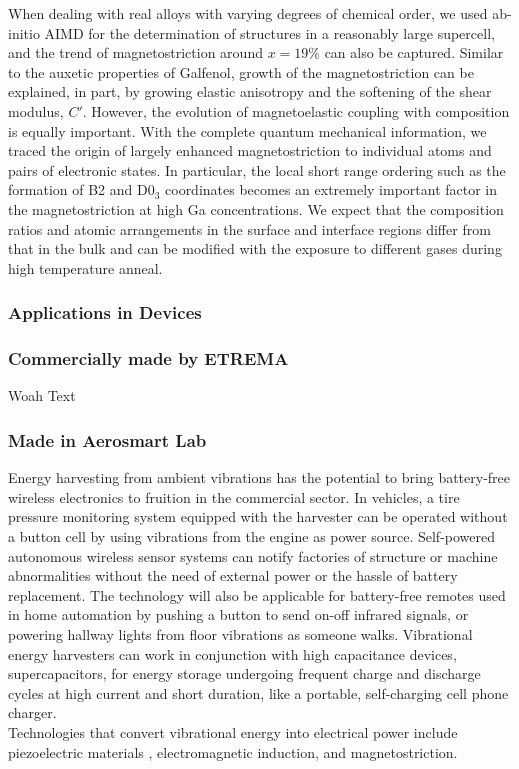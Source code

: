 When dealing with real alloys with varying degrees of chemical order, we used ab-initio AIMD for the determination of structures in a reasonably large supercell, and the trend of magnetostriction around $x=19\%$ can also be captured. Similar to the auxetic properties of Galfenol, growth of the magnetostriction can be explained, in part, by growing elastic anisotropy and the softening of the shear modulus, $C'$. However, the evolution of magnetoelastic coupling with composition is equally important. With the complete quantum mechanical information, we traced the origin of largely enhanced magnetostriction to individual atoms and pairs of electronic states. In particular, the local short range ordering such as the formation of B2 and D0$_{3}$ coordinates becomes an extremely important factor in the magnetostriction at high Ga concentrations. We expect that the composition ratios and atomic arrangements in the surface and interface regions differ from that in the bulk and can be modified with the exposure to different gases during high temperature anneal. 

\subsubsection{Applications in Devices}

\subsubsection{Commercially made by ETREMA}
Woah Text

\subsubsection{Made in Aerosmart Lab}

Energy harvesting from ambient vibrations has the potential to bring battery-free wireless electronics to fruition in the commercial sector. In vehicles, a tire pressure monitoring system equipped with the harvester can be operated without a button cell by using vibrations from the engine as power source. Self-powered autonomous wireless sensor systems can notify factories of structure or machine abnormalities without the need of external power or the hassle of battery replacement. The technology will also be applicable for battery-free remotes used in home automation by pushing a button to send on-off infrared signals, or powering hallway lights from floor vibrations as someone walks. Vibrational energy harvesters can work in conjunction with high capacitance devices, supercapacitors, for energy storage undergoing frequent charge and discharge cycles at high current and short duration, like a portable, self-charging cell phone charger.\\ Technologies that convert vibrational energy into electrical power include piezoelectric materials \cite{Gonzalez2002}, electromagnetic induction\cite{Saha2008}, and magnetostriction\cite{Ueno2011}. 



